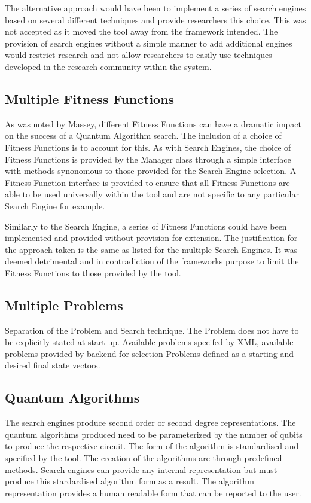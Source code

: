 \documentclass[authoryearcitations]{UoYCSproject}
\begin{document}
The alternative approach would have been to implement a series of search engines based on several different techniques and provide researchers this choice.
This was not accepted as it moved the tool away from the framework intended.
The provision of search engines without a simple manner to add additional engines would restrict research and not allow researchers to easily use techniques developed in the research community within the system.

\subsection{Multiple Fitness Functions}
As was noted by Massey\cite{masseythesis}, different Fitness Functions can have a dramatic impact on the success of a Quantum Algorithm search.
The inclusion of a choice of Fitness Functions is to account for this.
As with Search Engines, the choice of Fitness Functions is provided by the Manager class through a simple interface with methods synonomous to those provided for the Search Engine selection.
A Fitness Function interface is provided to ensure that all Fitness Functions are able to be used universally within the tool and are not specific to any particular Search Engine for example.

Similarly to the Search Engine, a series of Fitness Functions could have been implemented and provided without provision for extension.
The justification for the approach taken is the same as listed for the multiple Search Engines.
It was deemed detrimental and in contradiction of the frameworks purpose to limit the Fitness Functions to those provided by the tool.


\subsection{Multiple Problems}



Separation of the Problem and Search technique.
The Problem does not have to be explicitly stated at start up.
Available problems specifed by XML, available problems provided by backend for selection
Problems defined as a starting and desired final state vectors.

\subsection{Quantum Algorithms}
The search engines produce second order or second degree representations.
The quantum algorithms produced need to be parameterized by the number of qubits to produce the respective circuit.
The form of the algorithm is standardised and specified by the tool.
The creation of the algorithms are through predefined methods.
Search engines can provide any internal representation but must produce this stardardised algorithm form as a result.
The algorithm representation provides a human readable form that can be reported to the user.
\end{document}

